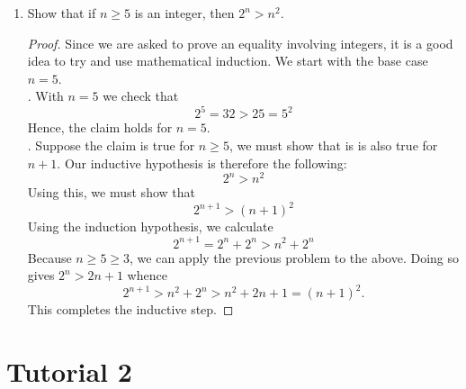 \documentclass[12pt, reqno]{article}
\numberwithin{equation}{section}
\theoremstyle{definition}
\theoremstyle{remark}
\begin{document}
\begin{enumerate}[leftmargin=*]
	\item Show that if $n \geq 5$ is an integer, then $2^n > n^2$.
	      \begin{proof}
		      Since we are asked to prove an equality involving integers, it is a good idea to try and use mathematical induction.  We start with the base case $n=5$.\\

		      \noindent{}. With $n= 5$ we check that
		      \[
			      2^5 = 32 > 25 = 5^2
		      \]
		      Hence, the claim holds for $n = 5$.\\

		      \noindent{}. Suppose the claim is true for $n \geq 5$, we must show that is is also true for $n+1$. Our inductive hypothesis is therefore the following:
		      \[
			      2^n > n^2
		      \]
		      Using this, we must show that
		      \[
			      2^{n+1} > (n+1)^2
		      \]
		      Using the induction hypothesis, we calculate
		      \[
			      2^{n+1} = 2^n + 2^n > n^2 + 2^n
		      \]
		      Because $n \geq 5 \geq 3$, we can apply the previous problem to the above. Doing so gives $2^n > 2n+1$ whence
		      \[
			      2^{n+1} > n^2 + 2^n > n^2 + 2n + 1 = (n+1)^2.
		      \]
		      This completes the inductive step.
	      \end{proof}

\end{enumerate}

\section*{Tutorial 2}
\end{document}
